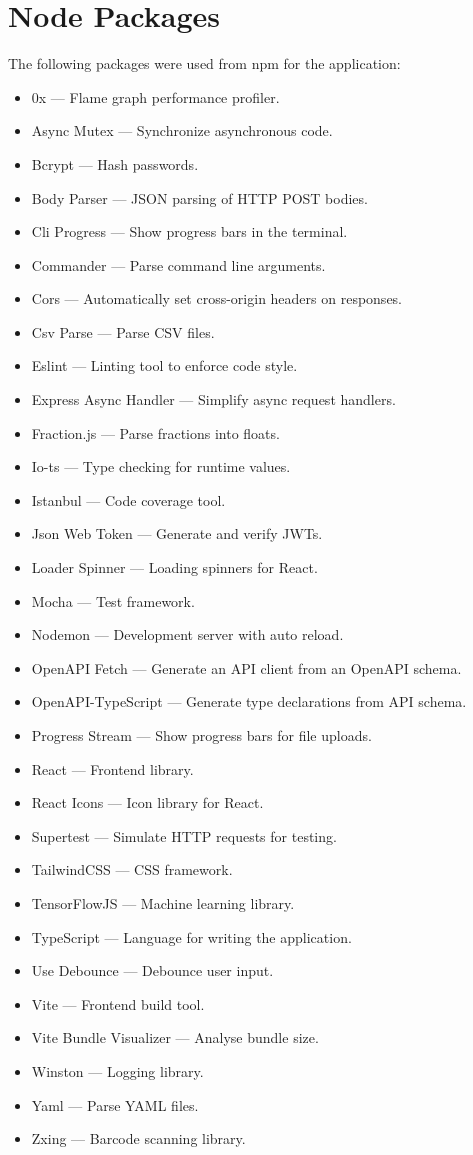 \documentclass[11pt, twoside, a4paper]{report}
\begin{document}
\section{Node Packages}
The following packages were used from npm for the application:
\begin{itemize}
    \item 0x --- Flame graph performance profiler.
    \item Async Mutex --- Synchronize asynchronous code.
    \item Bcrypt --- Hash passwords.
    \item Body Parser --- JSON parsing of HTTP POST bodies.
    \item Cli Progress --- Show progress bars in the terminal.
    \item Commander --- Parse command line arguments.
    \item Cors --- Automatically set cross-origin headers on responses.
    \item Csv Parse --- Parse CSV files.
    \item Eslint --- Linting tool to enforce code style.
    \item Express Async Handler --- Simplify async request handlers.
    \item Fraction.js --- Parse fractions into floats.
    \item Io-ts --- Type checking for runtime values.
    \item Istanbul --- Code coverage tool.
    \item Json Web Token --- Generate and verify JWTs.
    \item Loader Spinner --- Loading spinners for React.
    \item Mocha --- Test framework.
    \item Nodemon --- Development server with auto reload.
    \item OpenAPI Fetch --- Generate an API client from an OpenAPI schema.
    \item OpenAPI-TypeScript --- Generate type declarations from API schema.
    \item Progress Stream --- Show progress bars for file uploads.
    \item React --- Frontend library.
    \item React Icons --- Icon library for React.
    \item Supertest --- Simulate HTTP requests for testing.
    \item TailwindCSS --- CSS framework.
    \item TensorFlowJS --- Machine learning library.
    \item TypeScript --- Language for writing the application.
    \item Use Debounce --- Debounce user input.
    \item Vite --- Frontend build tool.
    \item Vite Bundle Visualizer --- Analyse bundle size.
    \item Winston --- Logging library.
    \item Yaml --- Parse YAML files.
    \item Zxing --- Barcode scanning library.
\end{itemize}
\end{document}
